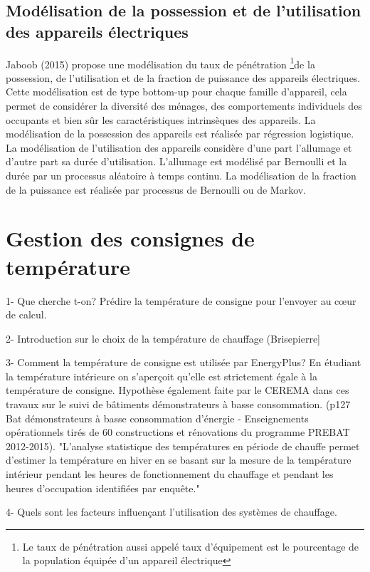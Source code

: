 \subsection{Modélisation de la possession et de l'utilisation des appareils électriques}

Jaboob (2015) propose une modélisation du taux de pénétration \footnote{Le taux de pénétration aussi appelé taux d'équipement est le pourcentage de la population équipée d'un appareil électrique}de la possession, de l'utilisation et de la fraction de puissance des appareils électriques. Cette modélisation est de type bottom-up pour chaque famille d'appareil, cela permet de considérer la diversité des ménages, des comportements individuels des occupants et bien sûr les caractéristiques intrinsèques des appareils. La modélisation de la possession des appareils est réalisée par régression logistique. La modélisation de l'utilisation des appareils considère d'une part l'allumage et d'autre part sa durée d'utilisation. L'allumage est modélisé par Bernoulli et la durée par un processus aléatoire à temps continu. La modélisation de la fraction de la puissance est réalisée par processus de Bernoulli ou de Markov.

\section{Gestion des consignes de température}

1- Que cherche t-on? Prédire la température de consigne pour l'envoyer au cœur de calcul.

2- Introduction sur le choix de la température de chauffage (Brisepierre]

3- Comment la température de consigne est utilisée par EnergyPlus? En étudiant la température intérieure on s'aperçoit qu'elle est strictement égale à la température de consigne. Hypothèse également faite par le CEREMA dans ces travaux sur le suivi de bâtiments démonstrateurs à basse consommation. (p127  Bat démonstrateurs à basse consommation d'énergie - Enseignements opérationnels tirés de 60 constructions et rénovations du programme PREBAT 2012-2015). "L'analyse statistique des températures en période de chauffe permet d'estimer la température en hiver en se basant sur la mesure de la température intérieur pendant les heures de fonctionnement du chauffage et pendant les heures d'occupation identifiées par enquête."

4- Quels sont les facteurs influençant l'utilisation des systèmes de chauffage.

